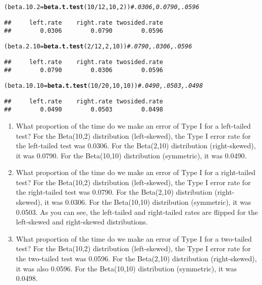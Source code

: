 \documentclass{article}\usepackage[]{graphicx}\usepackage[]{xcolor}
\makeatletter
\newcommand{\hlnum}[1]{\textcolor[rgb]{0.686,0.059,0.569}{#1}}%
\newcommand{\hlcom}[1]{\textcolor[rgb]{0.678,0.584,0.686}{\textit{#1}}}%
\newcommand{\hlopt}[1]{\textcolor[rgb]{0,0,0}{#1}}%
\newcommand{\hldef}[1]{\textcolor[rgb]{0.345,0.345,0.345}{#1}}%
\newcommand{\hlkwb}[1]{\textcolor[rgb]{0.69,0.353,0.396}{#1}}%
\newcommand{\hlkwd}[1]{\textcolor[rgb]{0.737,0.353,0.396}{\textbf{#1}}}%
\newenvironment{kframe}{%
 \def\at@end@of@kframe{}%
 \ifinner\ifhmode%
  \def\at@end@of@kframe{\end{minipage}}%
  \begin{minipage}{\columnwidth}%
 \fi\fi%
 \def\FrameCommand##1{\hskip\@totalleftmargin \hskip-\fboxsep
 \colorbox{shadecolor}{##1}\hskip-\fboxsep
     \hskip-\linewidth \hskip-\@totalleftmargin \hskip\columnwidth}%
 \MakeFramed {\advance\hsize-\width
   \@totalleftmargin\z@ \linewidth\hsize
   \@setminipage}}%
 {\par\unskip\endMakeFramed%
 \at@end@of@kframe}
\newenvironment{knitrout}{}{} %
\makeatother
\begin{document}
\begin{enumerate}
\begin{knitrout}
\begin{kframe}
\begin{alltt}
\hldef{(beta.10.2} \hlkwb{=} \hlkwd{beta.t.test}\hldef{(}\hlnum{10}\hlopt{/}\hlnum{12}\hldef{,} \hlnum{10}\hldef{,} \hlnum{2}\hldef{))} \hlcom{#.0306, 0.0790, .0596}
\end{alltt}
\begin{verbatim}
##     left.rate    right.rate twosided.rate 
##        0.0306        0.0790        0.0596
\end{verbatim}
\begin{alltt}
\hldef{(beta.2.10} \hlkwb{=} \hlkwd{beta.t.test}\hldef{(}\hlnum{2}\hlopt{/}\hlnum{12}\hldef{,} \hlnum{2}\hldef{,} \hlnum{10}\hldef{))} \hlcom{#.0790, .0306, .0596}
\end{alltt}
\begin{verbatim}
##     left.rate    right.rate twosided.rate 
##        0.0790        0.0306        0.0596
\end{verbatim}
\begin{alltt}
\hldef{(beta.10.10} \hlkwb{=} \hlkwd{beta.t.test}\hldef{(}\hlnum{10}\hlopt{/}\hlnum{20}\hldef{,} \hlnum{10}\hldef{,} \hlnum{10}\hldef{))} \hlcom{#.0490, .0503, .0498}
\end{alltt}
\begin{verbatim}
##     left.rate    right.rate twosided.rate 
##        0.0490        0.0503        0.0498
\end{verbatim}
\end{kframe}
\end{knitrout}
  \begin{enumerate}
    \item What proportion of the time do we make an error of Type I for a
    left-tailed test?
For the Beta(10,2) distribution (left-skewed), the Type I error rate for the left-tailed test was 0.0306. For the Beta(2,10) distribution (right-skewed), it was 0.0790. For the Beta(10,10) distribution (symmetric), it was 0.0490. 
    \item What proportion of the time do we make an error of Type I for a
    right-tailed test?
For the Beta(10,2) distribution (left-skewed), the Type I error rate for the right-tailed test was 0.0790. For the Beta(2,10) distribution (right-skewed), it was 0.0306. For the Beta(10,10) distribution (symmetric), it was 0.0503. As you can see, the left-tailed and right-tailed rates are flipped for the left-skewed and right-skewed distributions.
    \item What proportion of the time do we make an error of Type I for a
    two-tailed test?
For the Beta(10,2) distribution (left-skewed), the Type I error rate for the two-tailed test was 0.0596. For the Beta(2,10) distribution (right-skewed), it was also 0.0596. For the Beta(10,10) distribution (symmetric), it was 0.0498. 

\end{enumerate}
\end{enumerate}
\end{document}
